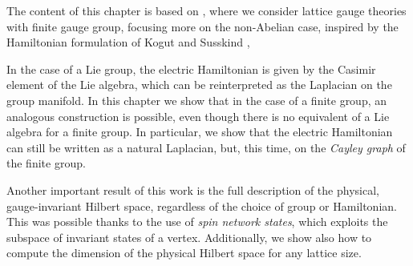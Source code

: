 \begin{description}[labelsep=1.1em]
    \item[Chap.~\ref{chap:finite_group_gauge_theories}]
        The content of this chapter is based on \cite{pradhan_unpublished}, where we consider lattice gauge theories with finite gauge group, focusing more on the non-Abelian case,
        inspired by the Hamiltonian formulation of Kogut and Susskind \cite{kogut1975hamiltonian},

        In the case of a Lie group, the electric Hamiltonian is given by the Casimir element of the Lie algebra, which can be reinterpreted as the Laplacian on the group manifold.
        In this chapter we show that in the case of a finite group, an analogous construction is possible, even though there is no equivalent of a Lie algebra for a finite group.
        In particular, we show that the electric Hamiltonian can still be written as a natural Laplacian, but, this time, on the \emph{Cayley graph} of the finite group.

        Another important result of this work is the full description of the physical, gauge-invariant Hilbert space, regardless of the choice of group or Hamiltonian.
        This was possible thanks to the use of \emph{spin network states}, which exploits the subspace of invariant states of a vertex.
        Additionally, we show also how to compute the dimension of the physical Hilbert space for any lattice size.

\end{description}

